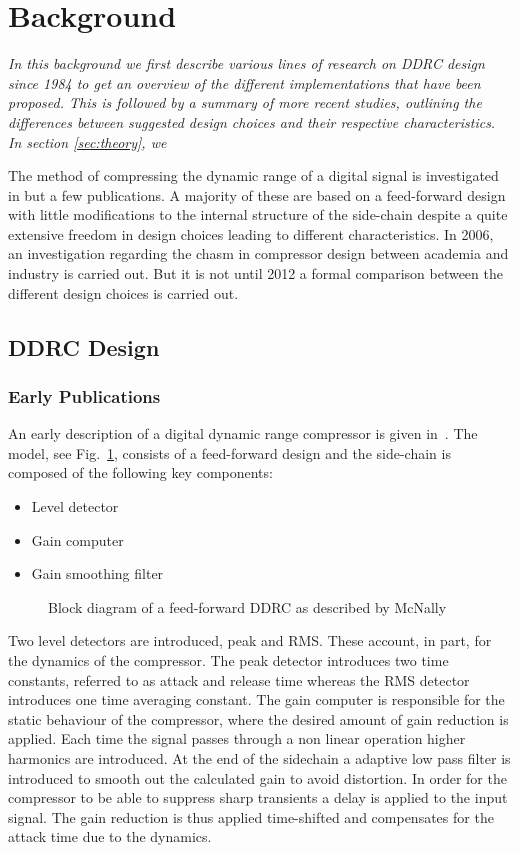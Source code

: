 \documentclass[../main2.tex]{subfiles}
\providecommand{\rootdir}{..}
\begin{document}
\section{Background} \label{background}
\emph{In this background we first describe various lines of research on DDRC design since 1984 to get an overview of the different implementations that have been proposed. This is followed by a summary of more recent studies, outlining the differences between suggested design choices and their respective characteristics. In section \ref{sec:theory}, we}

The method of compressing the dynamic range of a digital signal is investigated in but a few publications. A majority of these are based on a feed-forward design with little modifications to the internal structure of the side-chain despite a quite extensive freedom in design choices leading to different characteristics.  In 2006, an investigation regarding the chasm in compressor design between academia and industry is carried out. But it is not until 2012 a formal comparison between the different design choices is carried out.

\FloatBarrier
\subsection{DDRC Design}
\subsubsection{Early Publications}
An early description of a digital dynamic range compressor is given in~\cite{mcnally1984dynamic}. The model, see Fig.~\ref{fig:block_mcnally}, consists of a feed-forward  design and the side-chain is composed of the following key components:
\begin{itemize}
\item{Level detector}
\item{Gain computer}
\item{Gain smoothing filter}
\end{itemize}
\begin{figure}
\centerline{}
\caption{Block diagram of a feed-forward DDRC as described by McNally}
\label{fig:block_mcnally}
\end{figure}
Two level detectors are introduced, peak and RMS. These account, in part, for the dynamics of the compressor. The peak detector introduces two time constants, referred to as attack and release time whereas the RMS detector introduces one time averaging constant. The gain computer is responsible for the static behaviour of the compressor, where the desired amount of gain reduction is applied. Each time the signal passes through a non linear operation higher harmonics are introduced. At the end of the sidechain a adaptive low pass filter is introduced to smooth out the calculated gain to avoid distortion. In order for the compressor to be able to suppress sharp transients a delay is applied to the input signal. The gain reduction is thus applied time-shifted and compensates for the attack time due to the dynamics.
\end{document}
